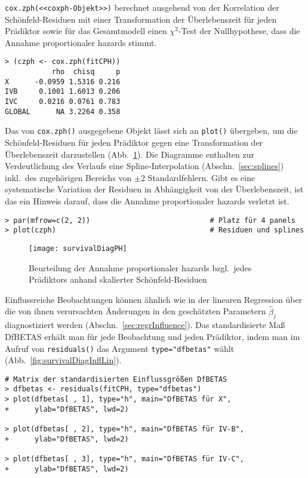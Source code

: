 \lstinline!cox.zph(<<coxph-Objekt>>)! berechnet ausgehend von der Korrelation der Schönfeld-Residuen mit einer Transformation der Überlebenszeit für jeden Prädiktor sowie für das Gesamtmodell einen $\chi^{2}$-Test der Nullhypothese, dass die Annahme proportionaler hazards stimmt.
\begin{lstlisting}
> (czph <- cox.zph(fitCPH))
           rho  chisq     p
X      -0.0959 1.5316 0.216
IVB     0.1001 1.6013 0.206
IVC     0.0216 0.0761 0.783
GLOBAL      NA 3.2264 0.358
\end{lstlisting}

Das von \lstinline!cox.zph()! ausgegebene Objekt lässt sich an \lstinline!plot()! übergeben, um die Schönfeld-Residuen für jeden Prädiktor gegen eine Transformation der Überlebenszeit darzustellen (Abb.\ \ref{fig:survivalDiagPH}). Die Diagramme enthalten zur Verdeutlichung des Verlaufs eine Spline-Interpolation (Abschn.\ \ref{sec:splines}) inkl.\ des zugehörigen Bereichs von $\pm 2$ Standardfehlern. Gibt es eine systematische Variation der Residuen in Abhängigkeit von der Überlebenszeit, ist das ein Hinweis darauf, dass die Annahme proportionaler hazards verletzt ist.
\begin{lstlisting}
> par(mfrow=c(2, 2))                            # Platz für 4 panels
> plot(czph)                                    # Residuen und splines
\end{lstlisting}

\begin{figure}[ht]
\centering
\texttt{[image: survivalDiagPH]}
\vspace*{-1em}
\caption{Beurteilung der Annahme proportionaler hazards bzgl.\ jedes Prädiktors anhand skalierter Schönfeld-Residuen}
\label{fig:survivalDiagPH}
\end{figure}

Einflussreiche Beobachtungen können ähnlich wie in der linearen Regression über die von ihnen verursachten Änderungen in den geschätzten Parametern $\hat{\beta}_{j}$ diagnostiziert werden (Abschn.\ \ref{sec:regrInfluence}). Das standardisierte Maß DfBETAS erhält man für jede Beobachtung und jeden Prädiktor, indem man im Aufruf von \lstinline!residuals()! das Argument \lstinline!type="dfbetas"! wählt (Abb.\ \ref{fig:survivalDiagInflLin}).
\begin{lstlisting}
# Matrix der standardisierten Einflussgrößen DfBETAS
> dfbetas <- residuals(fitCPH, type="dfbetas")
> plot(dfbetas[ , 1], type="h", main="DfBETAS für X",
+      ylab="DfBETAS", lwd=2)

> plot(dfbetas[ , 2], type="h", main="DfBETAS für IV-B",
+      ylab="DfBETAS", lwd=2)

> plot(dfbetas[ , 3], type="h", main="DfBETAS für IV-C",
+      ylab="DfBETAS", lwd=2)
\end{lstlisting}

